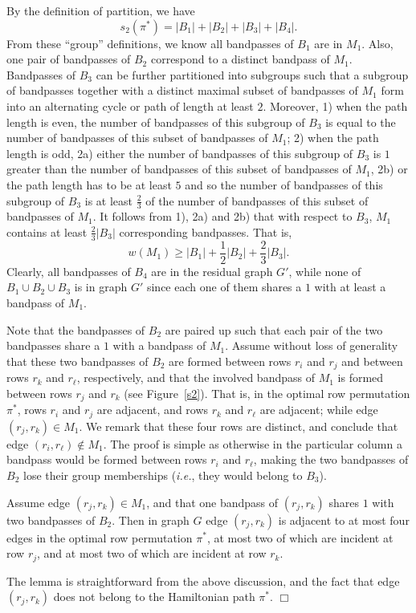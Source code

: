 \documentclass[11pt,twoside]{article}\usepackage{amssymb,latexsym,graphicx,hyperref}\usepackage{epstopdf}
\newenvironment{proof}{{\sc Proof. }}{\hfill$\Box$\vspace{0.2in}}
\begin{document}
By the definition of partition, we have
\begin{equation}
\label{eq3}
s_2(\pi^*) = |B_1| + |B_2| + |B_3| + |B_4|.
\end{equation}
From these ``group'' definitions, we know all bandpasses of $B_1$ are in $M_1$.
Also, one pair of bandpasses of $B_2$ correspond to a distinct bandpass of $M_1$.
Bandpasses of $B_3$ can be further partitioned into subgroups such that
a subgroup of bandpasses together with a distinct maximal subset of bandpasses of $M_1$ form into an alternating cycle or path of length at least $2$.
Moreover,
1) when the path length is even, the number of bandpasses of this subgroup of $B_3$ is equal to the number of bandpasses of this subset of bandpasses of $M_1$;
2) when the path length is odd,
2a) either the number of bandpasses of this subgroup of $B_3$ is $1$ greater than the number of bandpasses of this subset of bandpasses of $M_1$,
2b) or the path length has to be at least $5$ and
so the number of bandpasses of this subgroup of $B_3$ is at least $\frac 23$ of the number of bandpasses of this subset of bandpasses of $M_1$.
It follows from 1), 2a) and 2b) that with respect to $B_3$, $M_1$ contains at least $\frac 23 |B_3|$ corresponding bandpasses.
That is,
\begin{equation}
\label{eq4}
w(M_1) \ge |B_1| + \frac 12 |B_2| + \frac 23 |B_3|.
\end{equation}
Clearly, all bandpasses of $B_4$ are in the residual graph $G'$,
while none of $B_1 \cup B_2 \cup B_3$ is in graph $G'$ since each one of them shares a $1$ with at least a bandpass of $M_1$.


Note that the bandpasses of $B_2$ are paired up such that each pair of the two bandpasses share a $1$ with a bandpass of $M_1$.
Assume without loss of generality that these two bandpasses of $B_2$ are formed between rows $r_i$ and $r_j$ and between rows $r_k$ and $r_\ell$,
respectively, and that the involved bandpass of $M_1$ is formed between rows $r_j$ and $r_k$ (see Figure~\ref{s2}).
That is, in the optimal row permutation $\pi^*$, rows $r_i$ and $r_j$ are adjacent, and rows $r_k$ and $r_\ell$ are adjacent;
while edge $(r_j, r_k) \in M_1$.
We remark that these four rows are distinct, and conclude that edge $(r_i, r_\ell) \notin M_1$.
The proof is simple as otherwise in the particular column a bandpass would be formed between rows $r_i$ and $r_\ell$,
making the two bandpasses of $B_2$ lose their group memberships ({\it i.e.}, they would belong to $B_3$).


\begin{lemma}
\label{lemma2}
Assume edge $(r_j, r_k) \in M_1$, and that one bandpass of $(r_j, r_k)$ shares $1$ with two bandpasses of $B_2$.
Then in graph $G$ edge $(r_j, r_k)$ is adjacent to at most four edges in the optimal row permutation $\pi^*$,
at most two of which are incident at row $r_j$,
and at most two of which are incident at row $r_k$.
\end{lemma}
\begin{proof}
The lemma is straightforward from the above discussion, and the fact that edge $(r_j, r_k)$ does not belong to the Hamiltonian path $\pi^*$.
\end{proof}
\end{document}
